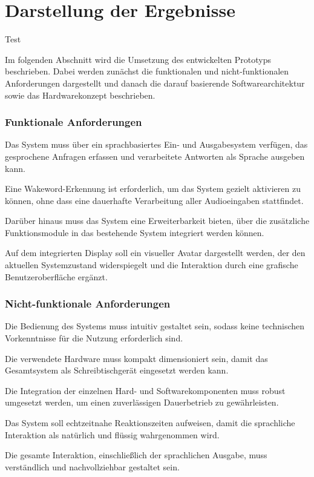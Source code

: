 \section{Darstellung der Ergebnisse}
Test 

Im folgenden Abschnitt wird die Umsetzung des entwickelten Prototyps beschrieben. 
Dabei werden zunächst die funktionalen und nicht-funktionalen Anforderungen dargestellt und danach die darauf basierende Softwarearchitektur sowie das Hardwarekonzept beschrieben. 

\subsubsection{Funktionale Anforderungen}

Das System muss über ein sprachbasiertes Ein- und Ausgabesystem verfügen, das gesprochene Anfragen erfassen und verarbeitete Antworten als Sprache ausgeben kann.

Eine Wakeword-Erkennung ist erforderlich, um das System gezielt aktivieren zu können, ohne dass eine dauerhafte Verarbeitung aller Audioeingaben stattfindet.

Darüber hinaus muss das System eine Erweiterbarkeit bieten, über die zusätzliche Funktionsmodule in das bestehende System integriert werden können.

Auf dem integrierten Display soll ein visueller Avatar dargestellt werden, der den aktuellen Systemzustand widerspiegelt und die Interaktion durch eine grafische Benutzeroberfläche ergänzt.

\subsubsection{Nicht-funktionale Anforderungen}

Die Bedienung des Systems muss intuitiv gestaltet sein, sodass keine technischen Vorkenntnisse für die Nutzung erforderlich sind.

Die verwendete Hardware muss kompakt dimensioniert sein, damit das Gesamtsystem als Schreibtischgerät eingesetzt werden kann.

Die Integration der einzelnen Hard- und Softwarekomponenten muss robust umgesetzt werden, um einen zuverlässigen Dauerbetrieb zu gewährleisten.

Das System soll echtzeitnahe Reaktionszeiten aufweisen, damit die sprachliche Interaktion als natürlich und flüssig wahrgenommen wird.

Die gesamte Interaktion, einschließlich der sprachlichen Ausgabe, muss verständlich und nachvollziehbar gestaltet sein.


